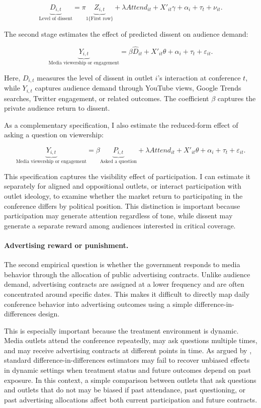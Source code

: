 \[
\underbrace{D_{i,t}}_{\text{Level of dissent}}
=
\pi
\underbrace{Z_{i,t}}_{\text{1\{First row\}}}
+
\lambda \textit{Attend}_{it}
+
X'_{it}\gamma
+
\alpha_i
+
\tau_t
+
\nu_{it}.
\]

The second stage estimates the effect of predicted dissent on audience demand:

\[
\underbrace{Y_{i,t}}_{\text{Media viewership or engagement}}
=
\beta \widehat{D}_{it}
+
X'_{it}\theta
+
\alpha_i
+
\tau_t
+
\varepsilon_{it}.
\]

Here, \(D_{i,t}\) measures the level of dissent in outlet \(i\)'s interaction at conference \(t\), while \(Y_{i,t}\) captures audience demand through YouTube views, Google Trends searches, Twitter engagement, or related outcomes. The coefficient \(\beta\) captures the private audience return to dissent.

As a complementary specification, I also estimate the reduced-form effect of asking a question on viewership:

\[
\underbrace{Y_{i,t}}_{\text{Media viewership or engagement}}
=
\beta
\underbrace{P_{i,t}}_{\text{Asked a question}}
+
\lambda \textit{Attend}_{it}
+
X'_{it}\theta
+
\alpha_i
+
\tau_t
+
\varepsilon_{it}.
\]

This specification captures the visibility effect of participation. I can estimate it separately for aligned and oppositional outlets, or interact participation with outlet ideology, to examine whether the market return to participating in the conference differs by political position. This distinction is important because participation may generate attention regardless of tone, while dissent may generate a separate reward among audiences interested in critical coverage.

\paragraph{Advertising reward or punishment.}

The second empirical question is whether the government responds to media behavior through the allocation of public advertising contracts. Unlike audience demand, advertising contracts are assigned at a lower frequency and are often concentrated around specific dates. This makes it difficult to directly map daily conference behavior into advertising outcomes using a simple difference-in-differences design.

This is especially important because the treatment environment is dynamic. Media outlets attend the conference repeatedly, may ask questions multiple times, and may receive advertising contracts at different points in time. As argued by \citet{marxjpe}, standard difference-in-differences estimators may fail to recover unbiased effects in dynamic settings when treatment status and future outcomes depend on past exposure. In this context, a simple comparison between outlets that ask questions and outlets that do not may be biased if past attendance, past questioning, or past advertising allocations affect both current participation and future contracts.

